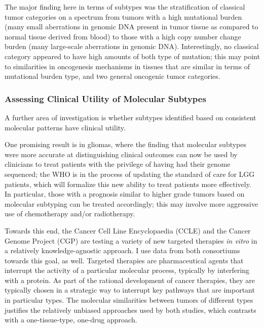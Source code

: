         The major finding here in terms of subtypes was the stratification of
        classical tumor categories on a spectrum from tumors with a high
        mutational burden (many small aberrations in genomic DNA present in
        tumor tissue as compared to normal tissue derived from blood) to those
        with a high copy number change burden (many large-scale aberrations in
        genomic DNA). Interestingly, no classical category appeared to have
        high amounts of both type of mutation; this may point to similarities
        in oncogenesis mechanisms in tissues that are similar in terms of
        mutational burden type, and two general oncogenic tumor
        categories.
        
        \subsubsection{Assessing Clinical Utility of Molecular Subtypes}

        A further area of investigation is whether subtypes identified
        based on consistent molecular patterns have clinical utility.

        
        One promising result is in gliomas, where the finding that molecular subtypes were more
        accurate at distinguishing clinical outcomes can now be used by
        clinicians to treat patients with the privilege of having had
        their genome sequenced; the WHO is in the process of updating
        the standard of care for LGG patients, which will formalize
        this new ability to treat patients more effectively. In
        particular, those with a prognosis similar to higher grade
      tumors based on molecular subtyping can be treated
        accordingly; this may involve more aggressive use of
        chemotherapy and/or radiotherapy.

        Towards this end, the Cancer Cell Line
        Encyclopaedia (CCLE)\cite{barretina_cancer_2012} and the Cancer
        Genome Project (CGP) \cite{ledford_end_2015} are testing a variety
        of new targeted therapies \textit{in vitro} in a relatively knowledge-agnostic
        approach. I use data from both consortiums towards this goal,
        as well. Targeted therapies are pharmaceutical agents that
        interrupt the activity of a particular molecular process,
        typically by interfering with a protein. As part of the
        rational development of cancer therapies, they are typically
        chosen in a strategic way to interrupt key pathways that are
        important in particular types. The molecular similarities
        between tumors of different types justifies the relatively
        unbiased approaches used by both studies, which contrasts with
        a one-tissue-type, one-drug approach.
        

